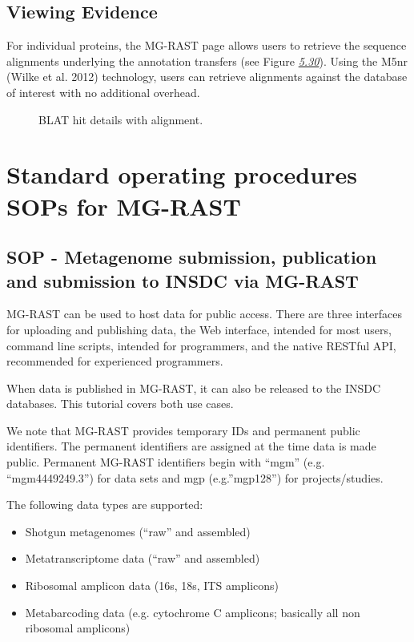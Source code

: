 \documentclass[letterpaper,10pt,english]{sphinxmanual}
\begin{document}
\section{Viewing Evidence}
\label{\detokenize{user_manual:viewing-evidence}}
For individual proteins, the MG-RAST page allows users to retrieve the
sequence alignments underlying the annotation transfers (see Figure
{\hyperref[\detokenize{user_manual:fig:blat-alignment}]{\emph{5.30}}}). Using the M5nr (Wilke et al. 2012)
technology, users can retrieve alignments against the database of
interest with no additional overhead.

\begin{figure}[htbp]
\centering
\capstart

\noindent{}
\caption{BLAT hit details with alignment.}\label{\detokenize{user_manual:fig-blat-alignment}}\end{figure}


\chapter{Standard operating procedures SOPs for MG-RAST}
\label{\detokenize{user_manual:standard-operating-procedures-sops-for-mg-rast}}

\section{SOP - Metagenome submission, publication and submission to INSDC via MG-RAST}
\label{\detokenize{user_manual:sop-metagenome-submission-publication-and-submission-to-insdc-via-mg-rast}}
MG-RAST can be used to host data for public access. There are three
interfaces for uploading and publishing data, the Web interface,
intended for most users, command line scripts, intended for programmers,
and the native RESTful API, recommended for experienced programmers.

When data is published in MG-RAST, it can also be released to the INSDC
databases. This tutorial covers both use cases.

We note that MG-RAST provides temporary IDs and permanent public
identifiers. The permanent identifiers are assigned at the time data is
made public. Permanent MG-RAST identifiers begin with “mgm” (e.g.
“mgm4449249.3”) for data sets and mgp (e.g.”mgp128”) for
projects/studies.

The following data types are supported:
\begin{itemize}
\item {} 
Shotgun metagenomes (“raw” and assembled)

\item {} 
Metatranscriptome data (“raw” and assembled)

\item {} 
Ribosomal amplicon data (16s, 18s, ITS amplicons)

\item {} 
Metabarcoding data (e.g. cytochrome C amplicons; basically all non
ribosomal amplicons)

\end{itemize}
\end{document}
